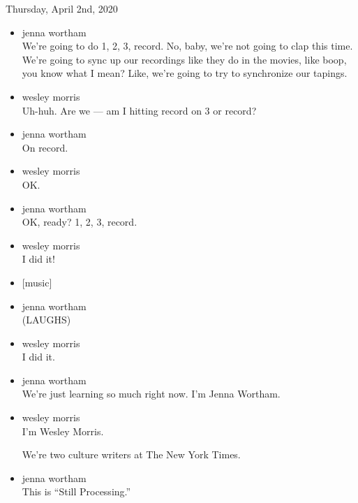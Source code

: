 Thursday, April 2nd, 2020

\begin{itemize}
\item
  jenna wortham\\
  We're going to do 1, 2, 3, record. No, baby, we're not going to clap
  this time. We're going to sync up our recordings like they do in the
  movies, like boop, you know what I mean? Like, we're going to try to
  synchronize our tapings.
\item
  wesley morris\\
  Uh-huh. Are we --- am I hitting record on 3 or record?
\item
  jenna wortham\\
  On record.
\item
  wesley morris\\
  OK.
\item
  jenna wortham\\
  OK, ready? 1, 2, 3, record.
\item
  wesley morris\\
  I did it!
\item
  {[}music{]}
\item
  jenna wortham\\
  (LAUGHS)
\item
  wesley morris\\
  I did it.
\item
  jenna wortham\\
  We're just learning so much right now. I'm Jenna Wortham.
\item
  wesley morris\\
  I'm Wesley Morris.

  We're two culture writers at The New York Times.
\item
  jenna wortham\\
  This is ``Still Processing.''


\end{itemize}
